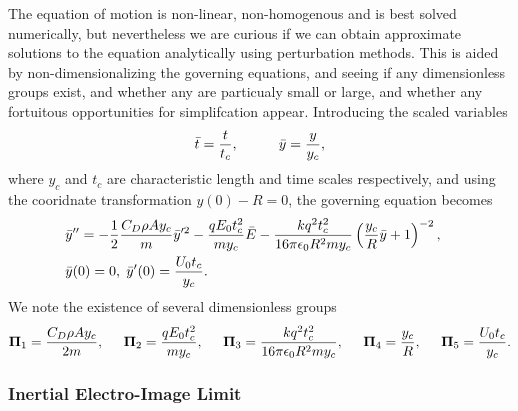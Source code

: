 \documentclass[a4paper, 12pt]{article}
\begin{document}
The equation of motion is non-linear, non-homogenous and is best solved numerically, but nevertheless we are curious if we can obtain approximate solutions to the equation analytically using perturbation methods. This is aided by non-dimensionalizing the governing equations, and seeing if any dimensionless groups exist, and whether any are particualy small or large, and whether any fortuitous opportunities for simplifcation appear. Introducing the scaled variables
\begin{equation}
 \bar{t} = \frac{t}{t_c}, \hspace{10 mm} \bar{y} = \frac{y}{y_c}, \end{equation}
where $y_c$ and $t_c$ are characteristic length and time scales respectively, and using the cooridnate transformation $y(0) - R = 0$, the governing equation becomes
\begin{eqnarray}
& \bar{y}'' = - \frac{1}{2} \frac{C_D \rho A y_c}{m} \bar{y}'^2
- \frac{q E_0 t_c^2}{m y_c} \bar{E} 
- \frac{k q^2 t_c^2}{16 \pi \epsilon_0 R^2 m y_c} \left( \frac{y_c}{R} \bar{y} + 1 \right)^{-2}, & \nonumber \\
& \bar{y}(0) = 0, \hspace{1 mm} \bar{y}'(0) = \frac{U_0 t_c}{y_c} .& \label{scaled_eqn}
\end{eqnarray}
We note the existence of several dimensionless groups
\[ \mathbf{\Pi}_1 = \frac{C_D \rho A y_c}{2 m}, \hspace{5 mm}
\mathbf{\Pi}_2 = \frac{q E_0 t_c^2}{m y_c}, \hspace{5 mm}
\mathbf{\Pi}_3 = \frac{k q^2 t_c^2}{16 \pi \epsilon_0 R^2 m y_c}, \hspace{5 mm}
\mathbf{\Pi}_4 = \frac{y_c}{R}, \hspace{5 mm}
\mathbf{\Pi}_5 = \frac{U_0 t_c}{y_c}.\]

\subsubsection{Inertial Electro-Image Limit}
\end{document}
